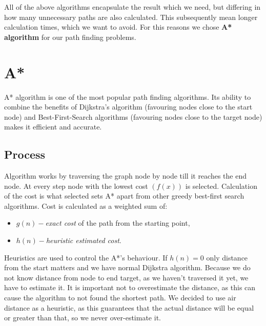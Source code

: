 All of the above algorithms encapsulate the result which we need, but differing in how many unnecessary paths are also calculated. This subsequently mean longer calculation times, which we want to avoid. For this reasons we chose \textbf{A* algorithm} for our path finding problems.

\section{A*}
A* algorithm is one of the most popular path finding algorithms. Its ability to combine the benefits of Dijkstra's algorithm (favouring nodes close to the start node) and Best-First-Search algorithms (favouring nodes close to the target node) makes it efficient and accurate. 
\subsection{Process}
Algorithm works by traversing the graph node by node till it reaches the end node. At every step node with the lowest cost $(f(x))$ is selected. Calculation of the cost is what selected sets A* apart from other greedy best-first search algorithms. Cost is calculated as a weighted sum of:
\begin{itemize}
\item $g(n) - $\textit{exact cost} of the path from the starting point,
\item $h(n) - $\textit{heuristic estimated cost}.
\end{itemize}
Heuristics are used to control the A*'s behaviour. If $h(n)=0$ only distance from the start matters and we have 
normal Dijkstra algorithm. Because we do not know distance from node to end target, as we haven't traversed it yet, we have to estimate it. It is important not to overestimate the distance, as this can cause the algorithm to not found the shortest path. We decided to use air distance as a heuristic, as this guarantees that the actual distance will be equal or greater than that, so we never over-estimate it.





